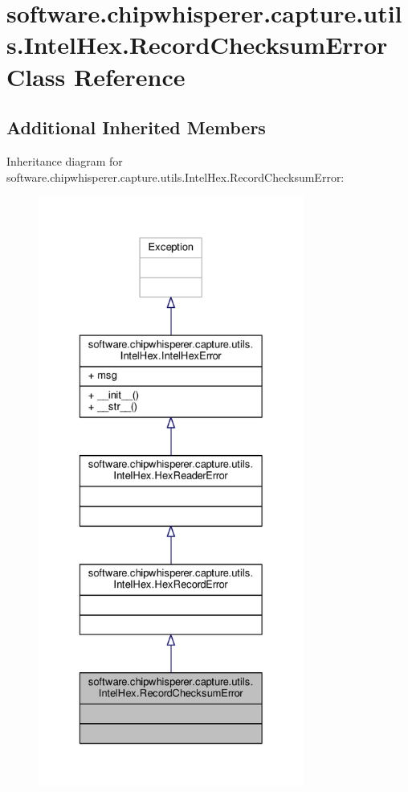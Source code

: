 \hypertarget{classsoftware_1_1chipwhisperer_1_1capture_1_1utils_1_1IntelHex_1_1RecordChecksumError}{}\section{software.\+chipwhisperer.\+capture.\+utils.\+Intel\+Hex.\+Record\+Checksum\+Error Class Reference}
\label{classsoftware_1_1chipwhisperer_1_1capture_1_1utils_1_1IntelHex_1_1RecordChecksumError}
\subsection*{Additional Inherited Members}


Inheritance diagram for software.\+chipwhisperer.\+capture.\+utils.\+Intel\+Hex.\+Record\+Checksum\+Error\+:\nopagebreak
\begin{figure}[H]
\begin{center}
\leavevmode
\includegraphics[height=550pt]{dc/dc1/classsoftware_1_1chipwhisperer_1_1capture_1_1utils_1_1IntelHex_1_1RecordChecksumError__inherit__graph}
\end{center}
\end{figure}



